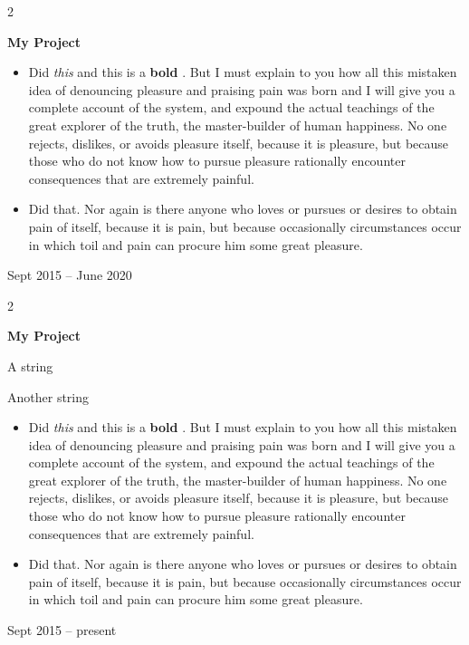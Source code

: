 \documentclass[10pt, letterpaper]{article}
\newenvironment{summary}{
    \begin{description}[
        topsep=0.10 cm,
        parsep=0.10 cm,
        partopsep=0pt,
        itemsep=0pt,
        leftmargin=0.4 cm + 10pt
    ]
}{
    \end{description}
} %
\newenvironment{highlights}{
    \begin{itemize}[
        topsep=0.10 cm,
        parsep=0.10 cm,
        partopsep=0pt,
        itemsep=0pt,
        leftmargin=0.4 cm + 10pt
    ]
}{
    \end{itemize}
} %
\newenvironment{twocolentry}[2][]{
    \onecolentry
    \def\secondColumn{#2}
    \setcolumnwidth{\fill, 4.5 cm}
    \begin{paracol}{2}
}{
    \switchcolumn \raggedleft \secondColumn
    \end{paracol}
    \endonecolentry
} %
\let\hrefWithoutArrow\href
\renewcommand{\href}[2]{\hrefWithoutArrow{#1}{\ifthenelse{\equal{#2}{}}{ }{#2 }\raisebox{.15ex}{\footnotesize \faExternalLink*}}}
\begin{document}
        \begin{twocolentry}{
            Sept 2015 – June 2020
        }
            \textbf{My Project}
            \begin{highlights}
                \item Did \textit{this} and this is a \textbf{bold} \href{https://example.com}{link}. But I must explain to you how all this mistaken idea of denouncing pleasure and praising pain was born and I will give you a complete account of the system, and expound the actual teachings of the great explorer of the truth, the master-builder of human happiness. No one rejects, dislikes, or avoids pleasure itself, because it is pleasure, but because those who do not know how to pursue pleasure rationally encounter consequences that are extremely painful.
                \item Did that. Nor again is there anyone who loves or pursues or desires to obtain pain of itself, because it is pain, but because occasionally circumstances occur in which toil and pain can procure him some great pleasure.
            \end{highlights}
        \end{twocolentry}


        \vspace{0.2 cm}

        \begin{twocolentry}{
            Sept 2015 – present
        }
            \textbf{My Project}
            \begin{summary}
                \item A string
                \item Another string
            \end{summary}
            \begin{highlights}
                \item Did \textit{this} and this is a \textbf{bold} \href{https://example.com}{link}. But I must explain to you how all this mistaken idea of denouncing pleasure and praising pain was born and I will give you a complete account of the system, and expound the actual teachings of the great explorer of the truth, the master-builder of human happiness. No one rejects, dislikes, or avoids pleasure itself, because it is pleasure, but because those who do not know how to pursue pleasure rationally encounter consequences that are extremely painful.
                \item Did that. Nor again is there anyone who loves or pursues or desires to obtain pain of itself, because it is pain, but because occasionally circumstances occur in which toil and pain can procure him some great pleasure.
            \end{highlights}
        \end{twocolentry}
\end{document}
